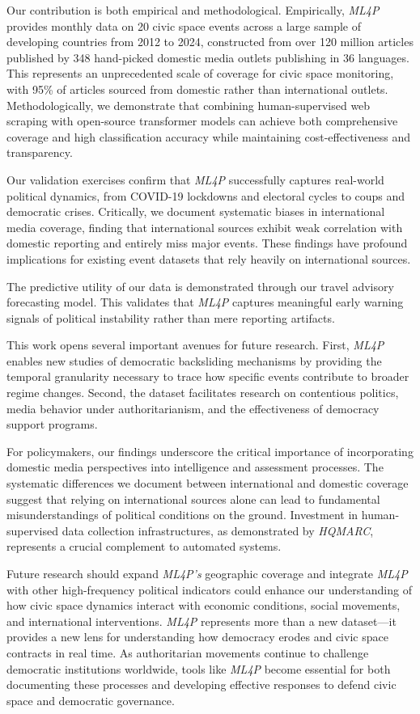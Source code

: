 \documentclass[
  letterpaper,
  DIV=11,
  numbers=noendperiod]{scrartcl}
\begin{document}
Our contribution is both empirical and methodological. Empirically,
\emph{ML4P} provides monthly data on 20 civic space events across a
large sample of developing countries from 2012 to 2024, constructed from
over 120 million articles published by 348 hand-picked domestic media
outlets publishing in 36 languages. This represents an unprecedented
scale of coverage for civic space monitoring, with 95\% of articles
sourced from domestic rather than international outlets.
Methodologically, we demonstrate that combining human-supervised web
scraping with open-source transformer models can achieve both
comprehensive coverage and high classification accuracy while
maintaining cost-effectiveness and transparency.

Our validation exercises confirm that \emph{ML4P} successfully captures
real-world political dynamics, from COVID-19 lockdowns and electoral
cycles to coups and democratic crises. Critically, we document
systematic biases in international media coverage, finding that
international sources exhibit weak correlation with domestic reporting
and entirely miss major events. These findings have profound
implications for existing event datasets that rely heavily on
international sources.

The predictive utility of our data is demonstrated through our travel
advisory forecasting model. This validates that \emph{ML4P} captures
meaningful early warning signals of political instability rather than
mere reporting artifacts.

This work opens several important avenues for future research. First,
\emph{ML4P} enables new studies of democratic backsliding mechanisms by
providing the temporal granularity necessary to trace how specific
events contribute to broader regime changes. Second, the dataset
facilitates research on contentious politics, media behavior under
authoritarianism, and the effectiveness of democracy support programs.

For policymakers, our findings underscore the critical importance of
incorporating domestic media perspectives into intelligence and
assessment processes. The systematic differences we document between
international and domestic coverage suggest that relying on
international sources alone can lead to fundamental misunderstandings of
political conditions on the ground. Investment in human-supervised data
collection infrastructures, as demonstrated by \emph{HQMARC}, represents
a crucial complement to automated systems.

Future research should expand \emph{ML4P's} geographic coverage and
integrate \emph{ML4P} with other high-frequency political indicators
could enhance our understanding of how civic space dynamics interact
with economic conditions, social movements, and international
interventions. \emph{ML4P} represents more than a new dataset---it
provides a new lens for understanding how democracy erodes and civic
space contracts in real time. As authoritarian movements continue to
challenge democratic institutions worldwide, tools like \emph{ML4P}
become essential for both documenting these processes and developing
effective responses to defend civic space and democratic governance.
\end{document}
